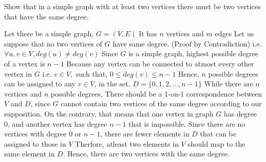 \documentclass[addpoints]{exam}
\begin{document}
\begin{questions}
\question[5] Show that in a simple graph with at least two vertices there must be two vertices that have the same degree.
  \begin{solution}
    Let there be a simple graph, $G = (V, E)$
    \newline It has $n$ vertices and $m$ edges
    \newline Let us suppose that no two vertices of $G$ have same degree. (Proof by Contradiction)
    \newline i.e. $\forall u, v \in V, deg(u) \not = deg(v)$
    \newline Since $G$ is a simple graph, highest possible degree of a vertex is $n-1$
    \newline Because any vertex can be connected to atmost every other vertex in $G$
    \newline i.e. $v \in V,$ such that, $0 \leq deg(v) \leq n-1$
    \newline Hence, $n$ possible degrees can be assigned to any $v \in V$, in the set, $D = \{ 0, 1, 2, ..., n-1 \}$
    \newline
    While there are $n$ vertices and $n$ possible degrees, 
    \newline There should be a 1-on-1 correspondence between $V$ and $D$, since $G$ cannot contain two vertices of the same degree according to our supposition.
    \newline On the contrary, that means that one vertex in graph $G$ has degree 0, and another vertex has degree $n-1$ that is impossible.
    \newline 
    \newline Since there are no vertices with degree $0$ or $n-1$, there are fewer elements in $D$ that can be assigned to those in $V$
    \newline Therfore, atleast two elements in $V$ should map to the same element in $D$.
    \newline Hence, there are two vertices with the same degree. 

  \end{solution}
  

\end{questions}
\end{document}
